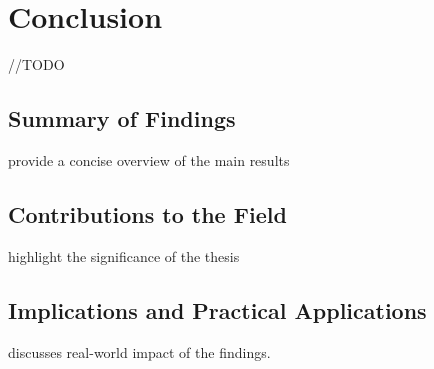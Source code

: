 \chapter{Conclusion}
\label{ch:conclusion}
//TODO

\section{Summary of Findings}
provide a concise overview of the main results

\section{Contributions to the Field}
highlight the significance of the thesis

\section{Implications and Practical Applications}
discusses real-world impact of the findings.